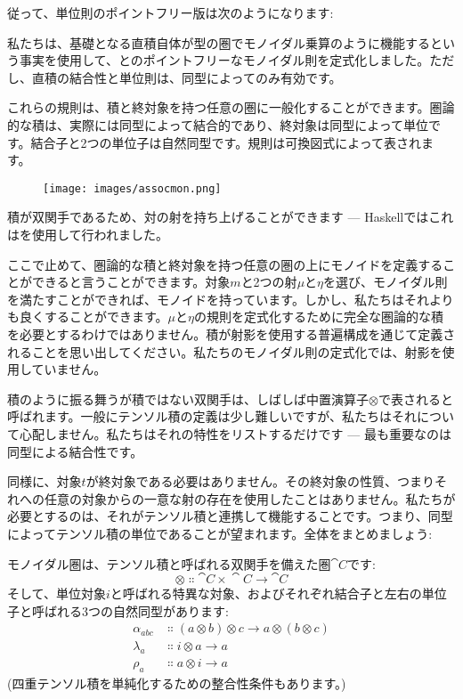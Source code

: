 
従って、単位則のポイントフリー版は次のようになります: 

私たちは、基礎となる直積自体が型の圏でモノイダル乗算のように機能するという事実を使用して、とのポイントフリーなモノイダル則を定式化しました。ただし、直積の結合性と単位則は、同型によってのみ有効です。

これらの規則は、積と終対象を持つ任意の圏に一般化することができます。圏論的な積は、実際には同型によって結合的であり、終対象は同型によって単位です。結合子と2つの単位子は自然同型です。規則は可換図式によって表されます。

\begin{figure}[H]
  \centering
  \texttt{[image: images/assocmon.png]}
\end{figure}

\noindent
積が双関手であるため、対の射を持ち上げることができます --- Haskellではこれはを使用して行われました。

ここで止めて、圏論的な積と終対象を持つ任意の圏の上にモノイドを定義することができると言うことができます。対象$m$と2つの射$\mu$と$\eta$を選び、モノイダル則を満たすことができれば、モノイドを持っています。しかし、私たちはそれよりも良くすることができます。$\mu$と$\eta$の規則を定式化するために完全な圏論的な積を必要とするわけではありません。積が射影を使用する普遍構成を通じて定義されることを思い出してください。私たちのモノイダル則の定式化では、射影を使用していません。

積のように振る舞うが積ではない双関手は、しばしば中置演算子$\otimes$で表されると呼ばれます。一般にテンソル積の定義は少し難しいですが、私たちはそれについて心配しません。私たちはそれの特性をリストするだけです --- 最も重要なのは同型による結合性です。

同様に、対象$t$が終対象である必要はありません。その終対象の性質、つまりそれへの任意の対象からの一意な射の存在を使用したことはありません。私たちが必要とするのは、それがテンソル積と連携して機能することです。つまり、同型によってテンソル積の単位であることが望まれます。全体をまとめましょう: 

モノイダル圏は、テンソル積と呼ばれる双関手を備えた圏$\cat{C}$です: 
\[\otimes \Colon \cat{C}\times{}\cat{C} \to \cat{C}\]
そして、単位対象$i$と呼ばれる特異な対象、およびそれぞれ結合子と左右の単位子と呼ばれる3つの自然同型があります: 
\begin{align*}
  \alpha_{a b c} & \Colon (a \otimes b) \otimes c \to a \otimes (b \otimes c) \\
  \lambda_a      & \Colon i \otimes a \to a                                   \\
  \rho_a         & \Colon a \otimes i \to a
\end{align*}
 (四重テンソル積を単純化するための整合性条件もあります。) 

